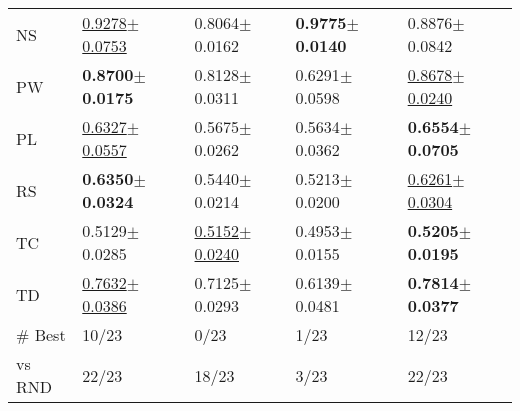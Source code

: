\begin{tabular}{lllll}
NS & \underline{0.9278$\pm$0.0753} & 0.8064$\pm$0.0162 & \textbf{0.9775$\pm$0.0140} & 0.8876$\pm$0.0842 \\
PW & \textbf{0.8700$\pm$0.0175} & 0.8128$\pm$0.0311 & 0.6291$\pm$0.0598 & \underline{0.8678$\pm$0.0240} \\
PL & \underline{0.6327$\pm$0.0557} & 0.5675$\pm$0.0262 & 0.5634$\pm$0.0362 & \textbf{0.6554$\pm$0.0705} \\
RS & \textbf{0.6350$\pm$0.0324} & 0.5440$\pm$0.0214 & 0.5213$\pm$0.0200 & \underline{0.6261$\pm$0.0304} \\
TC & 0.5129$\pm$0.0285 & \underline{0.5152$\pm$0.0240} & 0.4953$\pm$0.0155 & \textbf{0.5205$\pm$0.0195} \\
TD & \underline{0.7632$\pm$0.0386} & 0.7125$\pm$0.0293 & 0.6139$\pm$0.0481 & \textbf{0.7814$\pm$0.0377} \\
\midrule
\# Best & 10/23 & 0/23 & 1/23 & 12/23 \\
vs RND & 22/23 & 18/23 & 3/23 & 22/23 \\
\bottomrule
\end{tabular}
